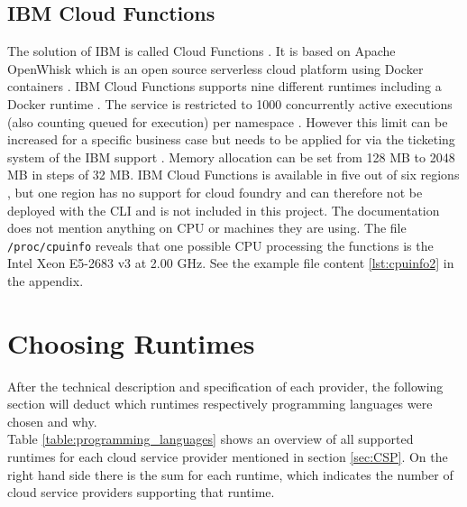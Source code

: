 \subsection{IBM Cloud Functions}

The solution of \gls{IBM} is called Cloud Functions \cite{IBMFunctions}. It is based on Apache OpenWhisk which is an open source serverless cloud platform using Docker containers \cite{OpenWhisk}. \gls{IBM} Cloud Functions supports nine different runtimes including a Docker runtime \cite{IBMRuntimes}. The service is restricted to 1000 concurrently active executions (also counting queued for execution) per namespace \cite{IBMLimits}. However this limit can be increased for a specific business case but needs to be applied for via the ticketing system of the \gls{IBM} support \cite{IBMLimits}. Memory allocation can be set from 128 \gls{MB} to 2048 \gls{MB} in steps of 32 \gls{MB}. \gls{IBM} Cloud Functions is available in five out of six regions \cite{IBMLocations}, but one region has no support for cloud foundry \cite{IBMCloudFoundry} and can therefore not be deployed with the \gls{CLI} and is not included in this project. The documentation does not mention anything on \gls{CPU} or machines they are using. The file \texttt{/proc/cpuinfo} reveals that one possible \gls{CPU} processing the functions is the Intel Xeon E5-2683 v3 at 2.00 \gls{GHz}. See the example file content \ref{lst:cpuinfo2} in the appendix.

\section{Choosing Runtimes}
After the technical description and specification of each provider, the following section will deduct which runtimes respectively programming languages were chosen and why.\\
Table \ref{table:programming_languages} shows an overview of all supported runtimes for each cloud service provider mentioned in section \ref{sec:CSP}. On the right hand side there is the sum for each runtime, which indicates the number of cloud service providers supporting that runtime.

